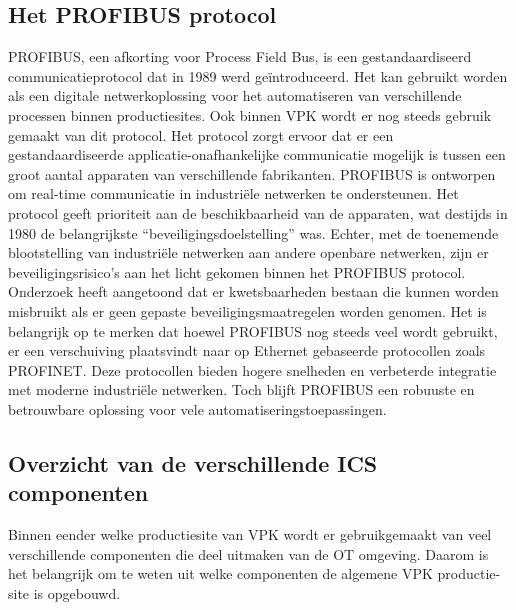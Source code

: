 \subsection{Het PROFIBUS protocol}
PROFIBUS, een afkorting voor Process Field Bus, is een gestandaardiseerd communicatieprotocol dat in 1989 werd geïntroduceerd. Het kan gebruikt worden als een digitale netwerkoplossing voor het automatiseren van verschillende processen binnen productiesites. \autocite{Profibus2022}
Ook binnen VPK wordt er nog steeds gebruik gemaakt van dit protocol.
Het protocol zorgt ervoor dat er een gestandaardiseerde applicatie-onafhankelijke communicatie mogelijk is tussen een groot aantal apparaten van verschillende fabrikanten. \autocite{Profibus2022}
PROFIBUS is ontworpen om real-time communicatie in industriële netwerken te ondersteunen. Het protocol geeft prioriteit aan de beschikbaarheid van de apparaten, wat destijds in 1980 de belangrijkste “beveiligingsdoelstelling” was. Echter, met de toenemende blootstelling van industriële netwerken aan andere openbare netwerken, zijn er beveiligingsrisico’s aan het licht gekomen binnen het PROFIBUS protocol. Onderzoek heeft aangetoond dat er kwetsbaarheden bestaan die kunnen worden misbruikt als er geen gepaste beveiligingsmaatregelen worden genomen. \autocite{Watson2017}
Het is belangrijk op te merken dat hoewel PROFIBUS nog steeds veel wordt gebruikt, er een verschuiving plaatsvindt naar op Ethernet gebaseerde protocollen zoals PROFINET. Deze protocollen bieden hogere snelheden en verbeterde integratie met moderne industriële netwerken. Toch blijft PROFIBUS een robuuste en betrouwbare oplossing voor vele automatiseringstoepassingen. \autocite{Aminaie2020}


\subsection{Overzicht van de verschillende ICS componenten}
Binnen eender welke productiesite van VPK wordt er gebruikgemaakt van veel verschillende componenten die deel uitmaken van de OT omgeving. Daarom is het belangrijk om te weten uit welke componenten de algemene VPK productie-site is opgebouwd. 

